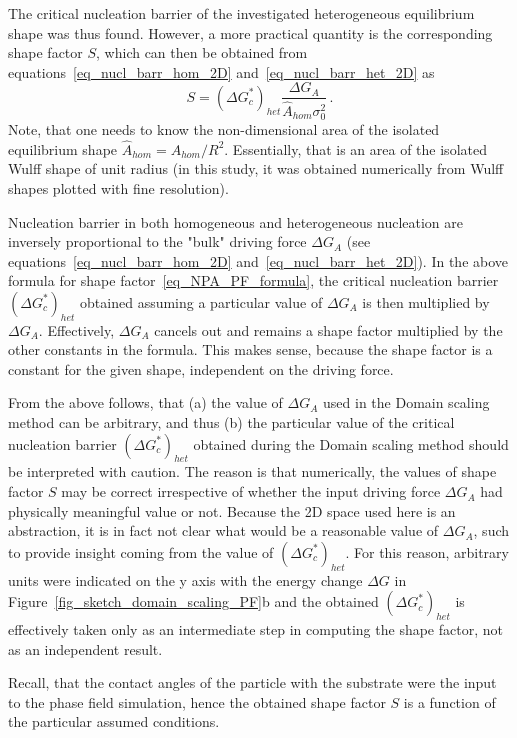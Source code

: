The critical nucleation barrier of the investigated heterogeneous equilibrium shape was thus found. However, a more practical quantity is the corresponding shape factor $S$, which can then be obtained from equations~\eqref{eq_nucl_barr_hom_2D} and~\eqref{eq_nucl_barr_het_2D} as
\begin{equation} \label{eq_NPA_PF_formula}
	S = (\Delta G_c^*)_{het}\frac{\Delta G_A}{\hat{A}_{hom}\sigma_0^2} \,.
\end{equation}
Note, that one needs to know the non-dimensional area of the isolated equilibrium shape $\hat{A}_{hom}=A_{hom}/R^2$. Essentially, that is an area of the isolated Wulff shape of unit radius (in this study, it was obtained numerically from Wulff shapes plotted with fine resolution).

Nucleation barrier in both homogeneous and heterogeneous nucleation are inversely proportional to the "bulk" driving force $\Delta G_A$ (see equations~\eqref{eq_nucl_barr_hom_2D} and~\eqref{eq_nucl_barr_het_2D}). In the above formula for shape factor~\eqref{eq_NPA_PF_formula}, the critical nucleation barrier $(\Delta G_c^*)_{het}$ obtained assuming a particular value of $\Delta G_A$ is then multiplied by $\Delta G_A$. Effectively, $\Delta G_A$ cancels out and remains a shape factor multiplied by the other constants in the formula. This makes sense, because the shape factor is a constant for the given shape, independent on the driving force. 

From the above follows, that (a) the value of $\Delta G_A$ used in the Domain scaling method can be arbitrary, and thus (b) the particular value of the critical nucleation barrier $(\Delta G_c^*)_{het}$ obtained during the Domain scaling method should be interpreted with caution. The reason is that numerically, the values of shape factor $S$ may be correct irrespective of whether the input driving force $\Delta G_A$ had physically meaningful value or not. Because the 2D space used here is an abstraction, it is in fact not clear what would be a reasonable value of $\Delta G_A$, such to provide insight coming from the value of  $(\Delta G_c^*)_{het}$. For this reason, arbitrary units were indicated on the y axis with the energy change $\Delta G$ in Figure~\ref{fig_sketch_domain_scaling_PF}b and the obtained  $(\Delta G_c^*)_{het}$ is effectively taken only as an intermediate step in computing the shape factor, not as an independent result.

Recall, that the contact angles of the particle with the substrate were the input to the phase field simulation, hence the obtained shape factor $S$ is a function of the particular assumed conditions. 

